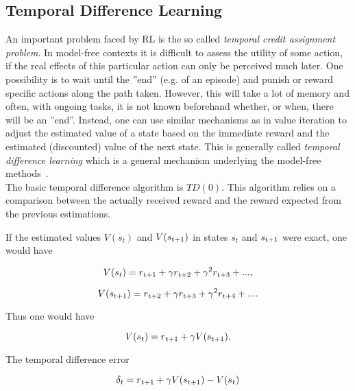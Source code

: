 \subsection{Temporal Difference Learning} An important problem faced by RL is the so called \textit{temporal credit assignment problem}. In model-free contexts it is difficult to assess the utility of some action, if the real effects of this particular action can only be perceived much later. One possibility is to wait until the ”end” (e.g. of an episode) and punish or reward specific actions along the path taken. However, this will take a lot of memory and often, with ongoing tasks, it is not known beforehand whether, or when, there will be an ”end”. Instead, one can use similar mechanisms as in value iteration to adjust the estimated value of a state based on the immediate reward and the estimated (discounted) value of the next state. This is generally called \textit{temporal difference learning} which is a general mechanism underlying the model-free methods~\cite{wiering2012reinforcement}. \\ 

The basic temporal difference algorithm is $TD(0)$. This algorithm relies on a comparison between the actually received reward and the reward expected from the previous estimations.

If the estimated values $V(s_t)$ and $V(s\textsubscript{t+1})$ in states $s_t$ and $s\textsubscript{t+1}$ were exact, one would have 

\begin{equation}
	V(s_t) = r\textsubscript{t+1} + \gamma r\textsubscript{t+2} + \gamma^2 r\textsubscript{t+3} + ...,
\end{equation}

\begin{equation}
	V(s\textsubscript{t+1}) = r\textsubscript{t+2} + \gamma r\textsubscript{t+3} + \gamma^2r\textsubscript{t+4} + ... .
\end{equation}

Thus one would have 

\begin{equation}
	V(s_t) = r\textsubscript{t+1} + \gamma V(s\textsubscript{t+1}).
\end{equation}

The temporal difference error

\begin{equation}
	\delta_t = r\textsubscript{t+1} + \gamma V(s\textsubscript{t+1}) - V(s_t)
\end{equation}

